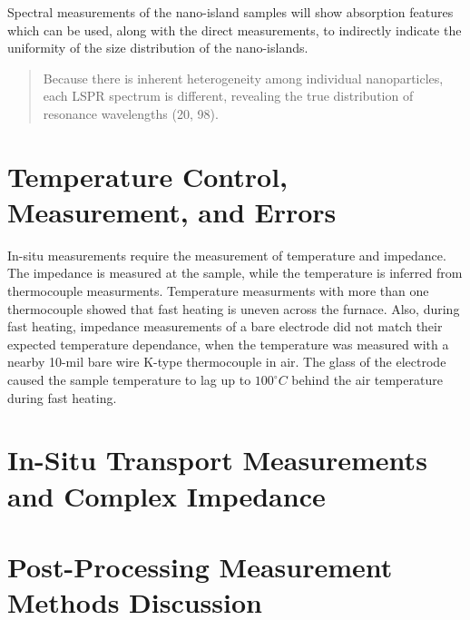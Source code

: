 \documentclass[12pt,oneside,english]{article}
\begin{document}
	
	Spectral measurements of the nano-island samples will show absorption features which can be used, along with the direct measurements, to indirectly indicate the uniformity of the size distribution of the nano-islands.
	
	\begin{quote}
		Because there is inherent heterogeneity among individual nanoparticles, each LSPR spectrum is different, revealing the true distribution of resonance wavelengths (20, 98).		
		\cite{willets2006}
	\end{quote}

	

	\clearpage 

	\section{Temperature Control, Measurement, and Errors}

	In-situ measurements require the measurement of temperature and impedance.  
	The impedance is measured at the sample, while the temperature is inferred from thermocouple measurments.
	Temperature measurments with more than one thermocouple showed that fast heating is uneven across the furnace.  
	Also, during fast heating, impedance measurements of a bare electrode did not match their expected temperature dependance, when the temperature was measured with a nearby 10-mil bare wire K-type thermocouple in air.
	The glass of the electrode caused the sample temperature to lag up to $100^{\circ}C$ behind the air temperature during fast heating.

	

	\section{In-Situ Transport Measurements and Complex Impedance}

	

	\section{ Post-Processing Measurement Methods Discussion }
\end{document}
